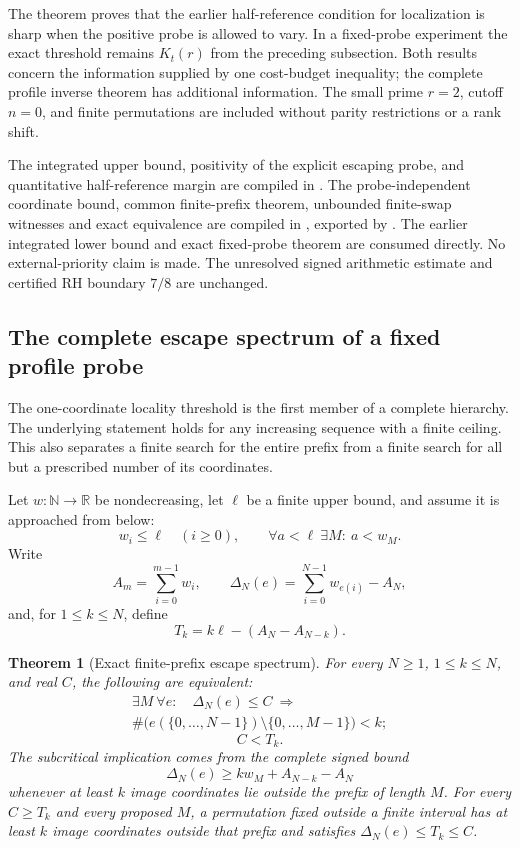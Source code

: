 \documentclass[11pt]{article}
\newtheorem{theorem}{Theorem}[section]
\theoremstyle{definition}
\begin{document}
The theorem proves that the earlier half-reference condition
for localization is sharp when the positive probe is allowed
to vary. In a fixed-probe experiment the exact threshold remains
$K_t(r)$ from the preceding subsection. Both results concern
the information supplied by one cost-budget inequality;
the complete profile inverse theorem has additional information.
The small prime $r=2$, cutoff $n=0$, and finite permutations
are included without parity restrictions or a rank shift.

\begin{flushleft}
The integrated upper bound, positivity of the explicit escaping
probe, and quantitative half-reference margin are compiled in
.
The probe-independent coordinate bound, common finite-prefix
theorem, unbounded finite-swap witnesses and exact equivalence
are compiled in
, exported by
.
The earlier integrated lower bound and exact fixed-probe theorem
are consumed directly. No external-priority claim is made.
The unresolved signed arithmetic estimate and certified RH
boundary $7/8$ are unchanged.
\end{flushleft}


\clearpage
\subsection{The complete escape spectrum of a fixed profile probe}

The one-coordinate locality threshold is the first member of a
complete hierarchy. The underlying statement holds for any
increasing sequence with a finite ceiling. This also separates
a finite search for the entire prefix from a finite search for
all but a prescribed number of its coordinates.

Let $w:\mathbb N\to\mathbb R$ be nondecreasing, let $\ell$ be
a finite upper bound, and assume it is approached from below:
\[
 w_i\le\ell\quad(i\ge0),\qquad
 \forall a<\ell\ \exists M:\ a<w_M.
\]
Write
\[
 A_m=\sum_{i=0}^{m-1}w_i,\qquad
 \Delta_N(e)=\sum_{i=0}^{N-1}w_{e(i)}-A_N,
\]
and, for $1\le k\le N$, define
\[
 T_k=k\ell-(A_N-A_{N-k}).
\]

\begin{theorem}[Exact finite-prefix escape spectrum]
For every $N\ge1$, $1\le k\le N$, and real $C$, the following
are equivalent:
\[
 \begin{gathered}
 \exists M\ \forall e:\quad
 \Delta_N(e)\le C\ \Longrightarrow\\
 \#\bigl(e(\{0,\ldots,N-1\})\setminus\{0,\ldots,M-1\}\bigr)<k;
 \end{gathered}
\]
\[
 C<T_k.
\]
The subcritical implication comes from the complete signed bound
\[
 \Delta_N(e)\ge k w_M+A_{N-k}-A_N
\]
whenever at least $k$ image coordinates lie outside the prefix
of length $M$.
For every $C\ge T_k$ and every proposed $M$, a permutation fixed
outside a finite interval has at least $k$ image coordinates
outside that prefix and satisfies $\Delta_N(e)\le T_k\le C$.
\end{theorem}
\end{document}

